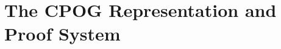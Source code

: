 \documentclass[letterpaper,USenglish,cleveref, autoref, thm-restate]{lipics-v2021}
\newcommand{\nil}{\bot}
\newcommand{\obar}[1]{\overline{#1}}
\begin{document}
\section{The CPOG Representation and Proof System}
\label{sect:cpog}


\end{document}
